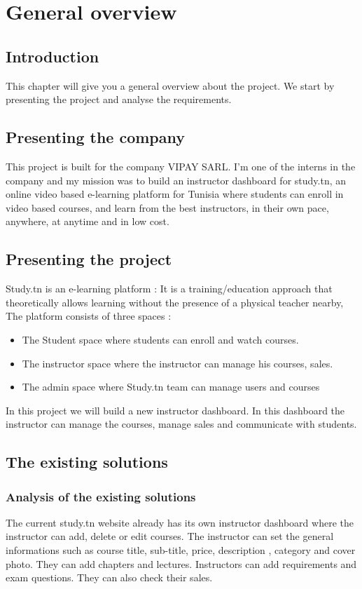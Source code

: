 \chapter{General overview}
\newpage
\section*{Introduction}
This chapter will give you a general overview about the project. We start by presenting the project and analyse the requirements.
\section{Presenting the company}
This project is built for the company VIPAY SARL. I'm one of the interns in the company and
my mission was to build an instructor dashboard for study.tn, an online video based e-learning platform for Tunisia where students can enroll in video based courses, and learn from the best instructors, in their own pace, anywhere, at anytime and in low cost.
\section{Presenting the project}
Study.tn is an e-learning platform : It is a training/education approach that theoretically allows learning without the presence of a physical teacher nearby, 
\hfill \break
\hfill \break
The platform consists of three spaces :

\begin{itemize}
  \item The Student space where students can enroll and watch courses.
  \item The instructor space where the instructor can manage his courses, sales.
  \item The admin space where Study.tn team can manage users and courses 
\end{itemize}

In this project we will build a new instructor dashboard. In this dashboard the instructor can manage the courses, manage sales and communicate with students.
\section{The existing solutions}
\subsection{Analysis of the existing solutions}
The current study.tn website already has its own instructor dashboard where the instructor can add, delete or edit courses. The instructor can set the general informations such as course title,
sub-title, price, description , category and cover photo. They can add chapters and lectures. Instructors can add requirements and exam questions. They can also check their sales.

